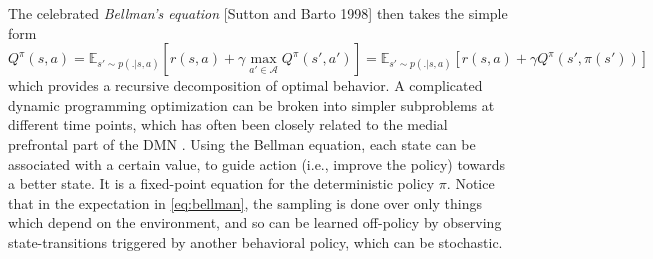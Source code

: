\documentclass[10pt,letterpaper]{article}
\begin{document}
The celebrated \textit{Bellman's equation} [Sutton and Barto 1998] then takes the simple form
\begin{equation}
  Q^\pi(s, a) = \mathbb E_{s' \sim p(.|s,a)} [r(s,a) + \gamma \max_{a' \in \mathcal A}Q^\pi(s', a')]
  = \mathbb E_{s' \sim p(.|s,a)} [r(s,a) + \gamma Q^\pi(s', \pi(s'))]
  \label{eq:bellman}
\end{equation}
which provides a recursive decomposition of optimal behavior.
A complicated dynamic programming optimization can be
broken into simpler subproblems at different time points,
which has often been closely related to the medial prefrontal part of the DMN
\citep{koechlin1999role, braver2002role}.
Using the Bellman equation, each state can be associated with a certain value,
to guide action (i.e., improve the policy) towards a better state.
It is a fixed-point equation for the deterministic policy $\pi$.
Notice that in the expectation in \eqref{eq:bellman}, the sampling is done over only things which
depend on the environment, and so can be learned off-policy by observing state-transitions
triggered by another behavioral policy, which can be stochastic.
\end{document}
